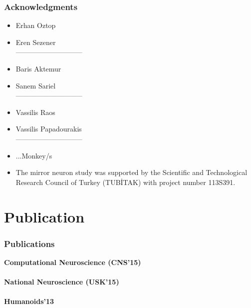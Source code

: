 \documentclass{beamer}
\begin{document}
\begin{frame}
\frametitle{Acknowledgments}
\begin{center}

\begin{itemize}


\item Erhan Oztop
\item Eren Sezener\\
-----------------------------
\item Baris Aktemur
\item Sanem Sariel\\
-----------------------------



\item Vassilis Raos
\item Vassilis Papadourakis \\
-----------------------------

\item ...Monkey/s
\item 
The mirror neuron study was supported by the Scientific and Technological Research Council of Turkey (TUB\.{I}TAK) with project number 113S391. 
\end{itemize}


\end{center}

\end{frame}

\section{ Publication}

\begin{frame}

\begin{center}
\frametitle{Publications}
\centering \textbf{Computational Neuroscience (CNS'15)}\\
\\
\centering \textbf{National Neuroscience (USK'15)}\\
\\
\centering \textbf{Humanoids'13}\\

\end{center}
\end{frame}
\end{document}
